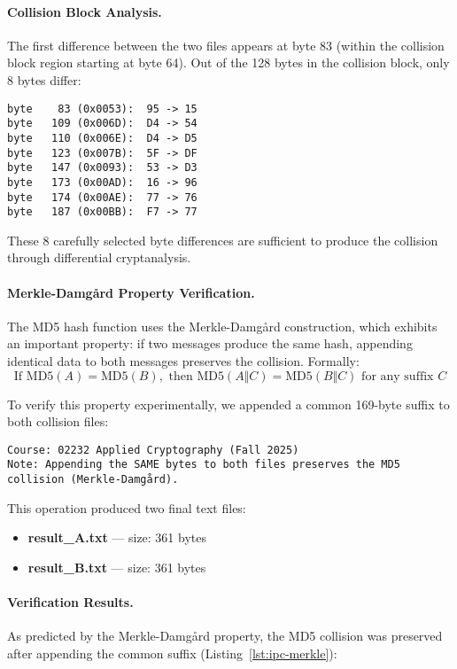 \documentclass[runningheads]{llncs}
\begin{document}
    \paragraph{Collision Block Analysis.}
    The first difference between the two files appears at byte 83 (within the collision block region starting at byte 64). Out of the 128 bytes in the collision block, only 8 bytes differ:

    \begin{lstlisting}[style=textblock,caption={Differing bytes in collision blocks},label={lst:ipc-diffs}]
byte    83 (0x0053):  95 -> 15
byte   109 (0x006D):  D4 -> 54
byte   110 (0x006E):  D4 -> D5
byte   123 (0x007B):  5F -> DF
byte   147 (0x0093):  53 -> D3
byte   173 (0x00AD):  16 -> 96
byte   174 (0x00AE):  77 -> 76
byte   187 (0x00BB):  F7 -> 77
    \end{lstlisting}

    These 8 carefully selected byte differences are sufficient to produce the collision through differential cryptanalysis.

    \paragraph{Merkle-Damgård Property Verification.}
    The MD5 hash function uses the Merkle-Damgård construction, which exhibits an important property: if two messages produce the same hash, appending identical data to both messages preserves the collision. Formally:
    \[
        \text{If } \mathrm{MD5}(A) = \mathrm{MD5}(B), \text{ then } \mathrm{MD5}(A\Vert C) = \mathrm{MD5}(B\Vert C) \text{ for any suffix } C
    \]

    To verify this property experimentally, we appended a common 169-byte suffix to both collision files:
    \begin{lstlisting}[style=textblock]
Course: 02232 Applied Cryptography (Fall 2025)
Note: Appending the SAME bytes to both files preserves the MD5 collision (Merkle-Damgård).
    \end{lstlisting}

    This operation produced two final text files:
    \begin{itemize}
        \item \textbf{result\_A.txt} — size: 361 bytes
        \item \textbf{result\_B.txt} — size: 361 bytes
    \end{itemize}

    \paragraph{Verification Results.}
    As predicted by the Merkle-Damgård property, the MD5 collision was preserved after appending the common suffix (Listing~\ref{lst:ipc-merkle}):
\end{document}
